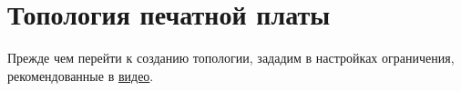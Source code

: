 \chapter{Топология печатной платы}

Прежде чем перейти к созданию топологии, зададим в настройках ограничения, рекомендованные в \href{https://www.youtube.com/watch?v=H46g1ZmeIxU&t=2524s}{видео}.


